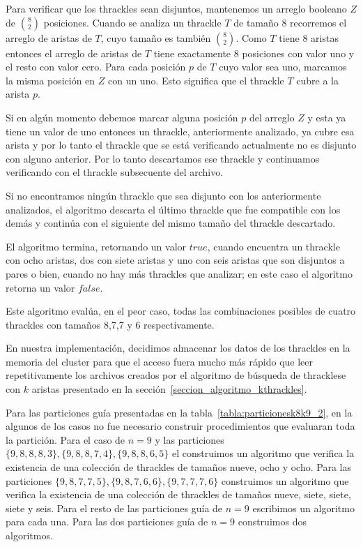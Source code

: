   Para verificar que los thrackles sean disjuntos, mantenemos un arreglo booleano $Z$ de
  $\binom{8}{2}$ posiciones. Cuando se analiza un thrackle $T$ de tamaño 8 recorremos el arreglo de
  aristas de $T$, cuyo tamaño es también $\binom{8}{2}$. Como $T$ tiene 8 aristas entonces el
  arreglo de aristas de $T$ tiene exactamente 8 posiciones con valor uno
  y el resto con valor cero. Para cada posición $p$ de $T$ cuyo valor sea uno, marcamos la misma
  posición en $Z$ con un uno. Esto significa que el thrackle $T$ cubre a la arista $p$.

  Si en algún momento debemos marcar alguna posición $p$ del arreglo $Z$ y esta ya tiene un valor
  de uno entonces un thrackle, anteriormente analizado, ya cubre esa arista y por lo tanto el
  thrackle que se está verificando actualmente no es disjunto con alguno anterior. Por lo tanto
  descartamos ese thrackle y continuamos verificando con el thrackle subsecuente del archivo.

  Si no encontramos ningún thrackle que sea disjunto con los anteriormente analizados, el
  algoritmo descarta el último thrackle que fue compatible con los demás y continúa con el
  siguiente del mismo tamaño del thrackle descartado.

  El algoritmo termina, retornando un valor $true$, cuando encuentra un thrackle con ocho
  aristas, dos con siete aristas y uno con seis aristas que son disjuntos a pares o bien, cuando
  no hay más thrackles que analizar; en este caso el algoritmo retorna un valor $false$.

  Este algoritmo evalúa, en el peor caso, todas las combinaciones posibles de cuatro
  thrackles con tamaños 8,7,7 y 6 respectivamente.


  En nuestra implementación, decidimos almacenar los datos de los thrackles en la memoria
  del cluster para que el acceso fuera mucho más rápido que leer repetitivamente los
  archivos creados por el algoritmo de búsqueda de thracklese con $k$ aristas presentado
  en la sección~\ref{seccion_algoritmo_kthrackles}.

  Para las particiones guía presentadas en la tabla~\ref{tabla:particionesk8k9_2}, en la
  algunos de los casos no fue necesario construir procedimientos que evaluaran toda la
  partición. Para el caso de $n=9$ y las particiones $\{9,8,8,8,3\},\{9,8,8,7,4\},\{9,8,8,6,5\}$ el
  construimos un algoritmo que verifica la existencia de una colección de thrackles de tamaños
  nueve, ocho y ocho. Para las particiones $\{9,8,7,7,5\},\{9,8,7,6,6\},\{9,7,7,7,6\}$ construimos
  un algoritmo que verifica la existencia de una colección de thrackles de tamaños nueve, siete,
  siete, siete y seis. Para el resto de las particiones guía de $n=9$ escribimos un algoritmo para
  cada una. Para las dos particiones guía de $n=9$ construimos dos algoritmos.

